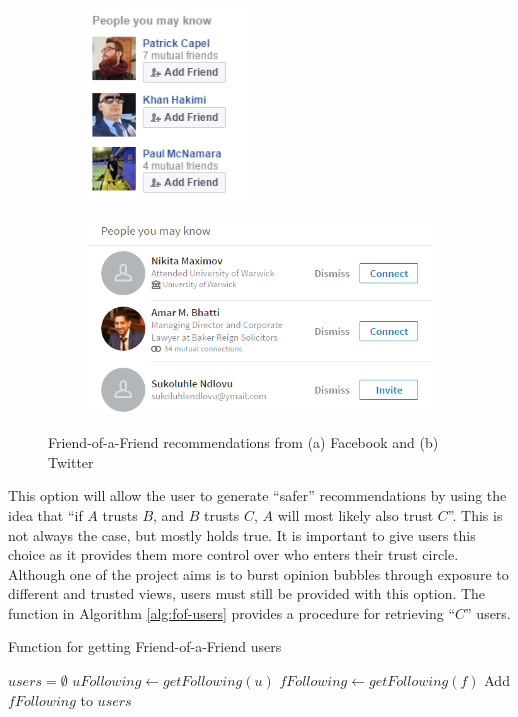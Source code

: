 \begin{figure}[h]
	\centering
	\begin{subfigure}[b]{.3\linewidth}
		\includegraphics[height=2in]{Images/Design/facebook}
		\caption{}
		\label{fig:fof-facebook}
	\end{subfigure}
	\begin{subfigure}[b]{.5\linewidth}
		\includegraphics[width=1\linewidth]{Images/Design/linkedin}
		\caption{}
		\label{fig:fof-linkedin}
	\end{subfigure}
	\caption{Friend-of-a-Friend recommendations from (a) Facebook and (b) Twitter}
	\label{fig:fof}
\end{figure}

This option will allow the user to generate ``safer'' recommendations by using the idea that ``if $A$ trusts $B$, and $B$ trusts $C$, $A$ will most likely also trust $C$''. This is not always the case, but mostly holds true. It is important to give users this choice as it provides them more control over who enters their trust circle. Although one of the project aims is to burst opinion bubbles through exposure to different and trusted views, users must still be provided with this option. The function in Algorithm \ref{alg:fof-users} provides a procedure for retrieving ``$C$'' users. 

\begin{algorithm}
\caption{Function for getting Friend-of-a-Friend users}
\label{alg:fof-users}
\begin{algorithmic}[1]
	\State $users = \emptyset$
	\State $uFollowing\gets getFollowing(u)$
		\State $fFollowing\gets getFollowing(f)$
		\State Add $fFollowing$ to $users$
	\EndFor
	\State {}		
\EndFunction
\end{algorithmic}
\end{algorithm}

